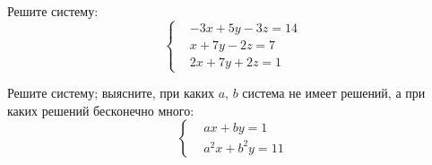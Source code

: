 %
%


\begin{problems}

\item
Решите систему:
\[ \left\{\begin{aligned}&
    - 3 x + 5 y - 3 z = 14
\\&
    x + 7 y - 2 z = 7
\\&
    2 x + 7 y + 2 z = 1
\end{aligned}\right.\]

\item
Решите систему; выясните, при каких $a$, $b$ система не имеет решений, а при
каких решений бесконечно много:
\[\left\{\begin{aligned}&
    a x + b y = 1
\\&
    a^2 x + b^2 y = 11
\end{aligned}\right.\]

\end{problems}

